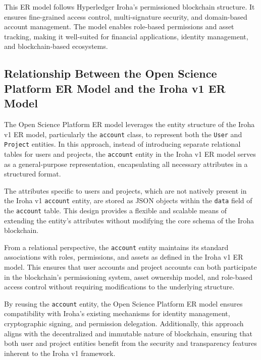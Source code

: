 \documentclass{article}
\begin{document}
This ER model follows Hyperledger Iroha’s permissioned blockchain structure. It ensures fine-grained access control, multi-signature security, and domain-based account management. The model enables role-based permissions and asset tracking, making it well-suited for financial applications, identity management, and blockchain-based ecosystems.


\subsection{Relationship Between the Open Science Platform ER Model and the Iroha v1 ER Model}

The Open Science Platform ER model leverages the entity structure of the Iroha v1 ER model, particularly the \texttt{account} class, to represent both the \texttt{User} and \texttt{Project} entities. In this approach, instead of introducing separate relational tables for users and projects, the \texttt{account} entity in the Iroha v1 ER model serves as a general-purpose representation, encapsulating all necessary attributes in a structured format.

The attributes specific to users and projects, which are not natively present in the Iroha v1 \texttt{account} entity, are stored as JSON objects within the \texttt{data} field of the \texttt{account} table. This design provides a flexible and scalable means of extending the entity's attributes without modifying the core schema of the Iroha blockchain.

From a relational perspective, the \texttt{account} entity maintains its standard associations with roles, permissions, and assets as defined in the Iroha v1 ER model. This ensures that user accounts and project accounts can both participate in the blockchain's permissioning system, asset ownership model, and role-based access control without requiring modifications to the underlying structure.

By reusing the \texttt{account} entity, the Open Science Platform ER model ensures compatibility with Iroha's existing mechanisms for identity management, cryptographic signing, and permission delegation. Additionally, this approach aligns with the decentralized and immutable nature of blockchain, ensuring that both user and project entities benefit from the security and transparency features inherent to the Iroha v1 framework.
\end{document}
